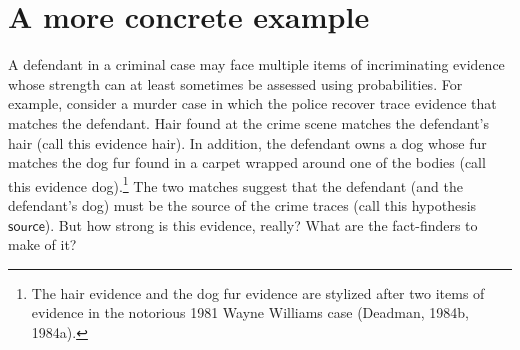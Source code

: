 \documentclass[
  10pt,
  dvipsnames,enabledeprecatedfontcommands]{scrartcl}
\begin{document}
\hypertarget{a-more-concrete-example}{%
\section{A more concrete example}\label{a-more-concrete-example}}

A defendant in a criminal case may face multiple items of incriminating
evidence whose strength can at least sometimes be assessed using
probabilities. For example, consider a murder case in which the police
recover trace evidence that matches the defendant. Hair found at the
crime scene matches the defendant's hair (call this evidence
\textsf{hair}). In addition, the defendant owns a dog whose fur matches
the dog fur found in a carpet wrapped around one of the bodies (call
this evidence \textsf{dog}).\footnote{The hair evidence and the dog fur
  evidence are stylized after two items of evidence in the notorious
  1981 Wayne Williams case (Deadman, 1984b, 1984a).} The two matches
suggest that the defendant (and the defendant's dog) must be the source
of the crime traces (call this hypothesis \(\mathsf{source}\)). But how
strong is this evidence, really? What are the fact-finders to make of
it?
\end{document}
